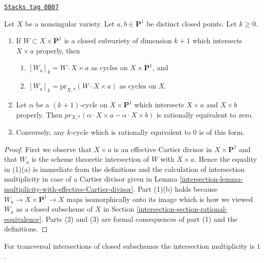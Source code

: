 \begin{lemma}
\label{intersection-lemma-rational-equivalence-and-intersection}
\href{https://stacks.math.columbia.edu/tag/0B07}{\texttt{Stacks tag 0B07}}

Let $X$ be a nonsingular variety. Let $a, b \in \mathbf{P}^1$
be distinct closed points. Let $k \geq 0$.
\begin{enumerate}
\item If $W \subset X \times \mathbf{P}^1$ is a closed subvariety
of dimension $k + 1$ which intersects $X \times a$ properly, then
\begin{enumerate}
\item $[W_a]_k = W \cdot X \times a$ as cycles on $X \times \mathbf{P}^1$, and
\item $[W_a]_k = \text{pr}_{X, *}(W \cdot X \times a)$ as cycles on $X$.
\end{enumerate}
\item Let $\alpha$ be a $(k + 1)$-cycle on $X \times \mathbf{P}^1$
which intersects $X \times a$ and $X \times b$ properly. Then
$pr_{X,*}( \alpha \cdot X \times a - \alpha \cdot X \times b)$
is rationally equivalent to zero.
\item Conversely, any $k$-cycle which is
rationally equivalent to $0$ is of this form.
\end{enumerate}
\end{lemma}

\begin{proof}

First we observe that $X \times a$ is an effective Cartier divisor in
$X \times \mathbf{P}^1$ and that $W_a$ is the scheme theoretic intersection
of $W$ with $X \times a$. Hence the equality in (1)(a) is
immediate from the definitions and the calculation of intersection
multiplicity in case of a Cartier divisor given in
Lemma \ref{intersection-lemma-multiplicity-with-effective-Cartier-divisor}.
Part (1)(b) holds because $W_a \to X \times \mathbf{P}^1 \to X$ maps
isomorphically onto its image which is how we viewed $W_a$
as a closed subscheme of $X$ in Section \ref{intersection-section-rational-equivalence}.
Parts (2) and (3) are formal consequences of part (1) and the definitions.
\end{proof}

For transversal intersections of closed subschemes the intersection
multiplicity is $1$.

